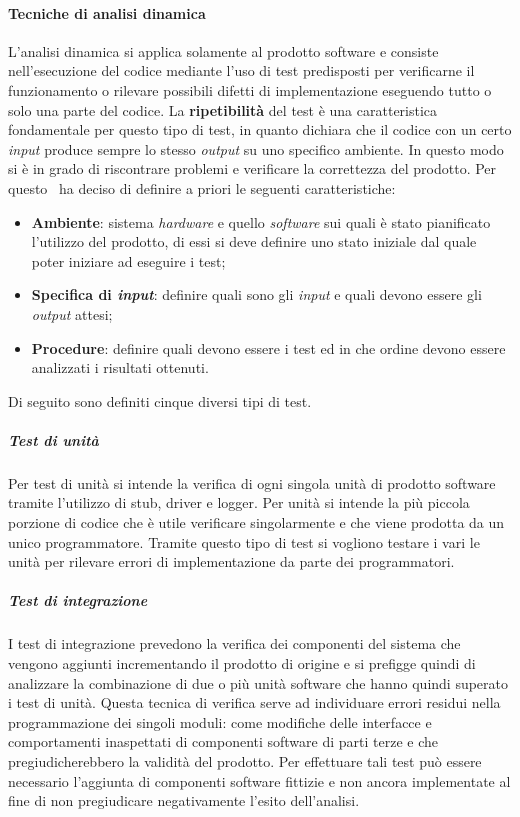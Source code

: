 \paragraph{Tecniche di analisi dinamica}
L'analisi dinamica si applica solamente al prodotto software e consiste nell'esecuzione del codice mediante l'uso di test predisposti per verificarne il funzionamento o rilevare possibili difetti di implementazione eseguendo tutto o solo una parte del codice.
La \textbf{ripetibilità} del test è una caratteristica fondamentale per questo tipo di test, in quanto dichiara che il codice con un certo \textit{input} produce sempre lo stesso \textit{output} su uno specifico ambiente. In questo modo si è in grado di riscontrare problemi e verificare la correttezza del prodotto.
Per questo \gruppo ~ha deciso di definire a priori le seguenti caratteristiche:
\begin{itemize}
\item \textbf{Ambiente}: sistema \textit{hardware} e quello \textit{software} sui quali è stato pianificato l'utilizzo del prodotto, di essi si deve definire uno stato iniziale dal quale poter iniziare ad eseguire i test;
\item \textbf{Specifica di \textit{input}}: definire quali sono gli \textit{input} e quali devono essere gli \textit{output} attesi;
\item \textbf{Procedure}: definire quali devono essere i test ed in che ordine devono essere analizzati i risultati ottenuti.
\end{itemize}
Di seguito sono definiti cinque diversi tipi di test.
\subparagraph{Test di unità} 
Per test di unità si intende la verifica di ogni singola unità di prodotto software tramite l'utilizzo di stub, driver e logger. Per unità si intende la più piccola porzione di codice che è utile verificare singolarmente e che viene prodotta da un unico programmatore. Tramite questo tipo di test si vogliono testare i vari le unità per rilevare errori di implementazione da parte dei programmatori.
\subparagraph{Test di integrazione}
I test di integrazione prevedono la verifica dei componenti del sistema che vengono aggiunti incrementando il prodotto di origine e si prefigge quindi di analizzare la combinazione di due o più unità software che hanno quindi superato i test di unità. Questa tecnica di verifica serve ad individuare errori residui nella programmazione dei singoli moduli: come modifiche delle interfacce e comportamenti inaspettati di componenti software di parti terze e che pregiudicherebbero la validità del prodotto. Per effettuare tali test può essere necessario l'aggiunta di componenti software fittizie e non ancora implementate al fine di non pregiudicare negativamente l'esito dell'analisi.

